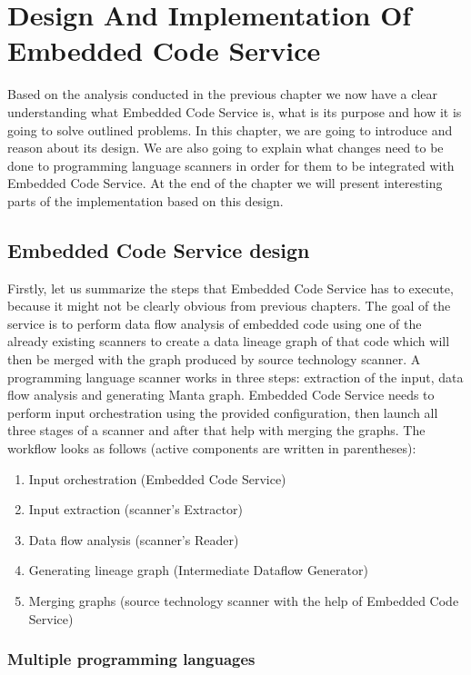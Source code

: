 \chapter{Design And Implementation Of Embedded Code Service}

Based on the analysis conducted in the previous chapter we now have a clear understanding what Embedded Code Service is, what is its purpose and how it is going to solve outlined problems. In this chapter, we are going to introduce and reason about its design. We are also going to explain what changes need to be done to programming language scanners in order for them to be integrated with Embedded Code Service. At the end of the chapter we will present interesting parts of the implementation based on this design.

\section{Embedded Code Service design}

Firstly, let us summarize the steps that Embedded Code Service has to execute, because it might not be clearly obvious from previous chapters. The goal of the service is to perform data flow analysis of embedded code using one of the already existing scanners to create a data lineage graph of that code which will then be merged with the graph produced by source technology scanner. A programming language scanner works in three steps: extraction of the input, data flow analysis and generating Manta graph. Embedded Code Service needs to perform input orchestration using the provided configuration, then launch all three stages of a scanner and after that help with merging the graphs. The workflow looks as follows (active components are written in parentheses):
\begin{enumerate}
    \item Input orchestration (Embedded Code Service)
    \item Input extraction (scanner's Extractor)
    \item Data flow analysis (scanner's Reader)
    \item Generating lineage graph (Intermediate Dataflow Generator)
    \item Merging graphs (source technology scanner with the help of Embedded Code Service)
\end{enumerate}

\subsection{Multiple programming languages}

